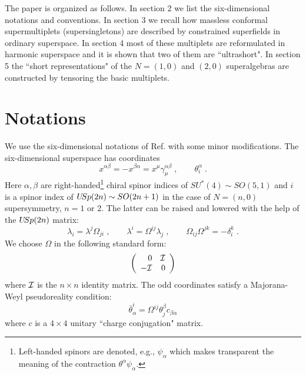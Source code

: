 \documentclass[a4paper,12pt]{article}
\begin{document}
The paper is organized as follows. In section 2 we list the 
six-dimensional notations and conventions. In section 3 we recall 
how massless conformal supermultiplets (supersingletons) are 
described by constrained superfields in ordinary superspace. In 
section 4 most of these multiplets are reformulated in harmonic 
superspace and it is shown that two of them are ``ultrashort". In 
section 5 the ``short representations" of the $N=(1,0)$ and 
$(2,0)$ superalgebras are constructed by tensoring the basic 
multiplets.  




\section{Notations}

We use the six-dimensional notations of Ref. \cite{ckvp} with some 
minor modifications. The six-dimensional superspace has 
coordinates
\begin{equation}\label{1}
  x^{\alpha\beta}=- x^{\beta\alpha} = x^\mu\gamma_\mu^{\alpha\beta} 
\;, \qquad \theta^\alpha_i\;.
\end{equation}
Here $\alpha, \beta$ are right-handed\footnote{Left-handed spinors 
are denoted, e.g., $\psi_\alpha$ which makes transparent the 
meaning of the contraction $\theta^\alpha\psi_\alpha$.} chiral 
spinor indices of $SU^*(4)\sim SO(5,1)$ and $i$ is a spinor index 
of $U\hskip-2pt Sp(2n)\sim SO(2n+1)$  in the case of $N=(n,0)$ 
supersymmetry, $n=1$ or 2. The latter can be raised and lowered 
with the help of the $U\hskip-2pt Sp(2n)$ matrix: 
\begin{equation}\label{2}
  \lambda_i = \lambda^j\Omega_{ji}\;, \qquad \lambda^i = 
\Omega^{ij}\lambda_j\;, \qquad \Omega_{ij}\Omega^{jk} = 
-\delta^k_i\;. 
\end{equation}
We choose $\Omega$ in the following standard form:
\begin{equation}\label{3}
  \left(
  \begin{array}{rr}
    0 & \cal I \\
    -\cal I & 0
  \end{array}
 \right)
  \end{equation}
where $\cal I$ is the $n\times n$ identity matrix. The odd 
coordinates satisfy a Majorana-Weyl pseudoreality condition: 
\begin{equation}\label{4}
  \bar\theta_\alpha^i = \Omega^{ij}\theta_j^\beta c_{\beta\alpha}
\end{equation}
where $c$ is a $4\times 4$ unitary ``charge conjugation" matrix.  
\end{document}
